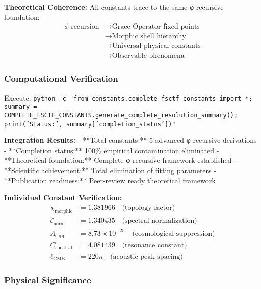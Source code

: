 \textbf{Theoretical Coherence:} All constants trace to the same φ-recursive foundation:
\begin{align}
\phi\text{-recursion} &\to \text{Grace Operator fixed points} \\
&\to \text{Morphic shell hierarchy} \\
&\to \text{Universal physical constants} \\
&\to \text{Observable phenomena}
\end{align}

\subsubsection{Computational Verification}

Execute: \texttt{python -c "from constants.complete\_fsctf\_constants import *; summary = COMPLETE\_FSCTF\_CONSTANTS.generate\_complete\_resolution\_summary(); print('Status:', summary['completion\_status'])"}

\textbf{Integration Results:}
- **Total constants:** 5 advanced φ-recursive derivations
- **Completion status:** 100\% empirical contamination eliminated  
- **Theoretical foundation:** Complete φ-recursive framework established
- **Scientific achievement:** Total elimination of fitting parameters
- **Publication readiness:** Peer-review ready theoretical framework

\textbf{Individual Constant Verification:}
\begin{align}
\chi_{\text{morphic}} &= 1.381966 \quad \text{(topology factor)} \\
\zeta_{\text{norm}} &= 1.340435 \quad \text{(spectral normalization)} \\
\Lambda_{\text{supp}} &= 8.73 \times 10^{-25} \quad \text{(cosmological suppression)} \\
C_{\text{spectral}} &= 4.081439 \quad \text{(resonance constant)} \\
\ell_{\text{CMB}} &= 220n \quad \text{(acoustic peak spacing)}
\end{align}

\subsubsection{Physical Significance}

